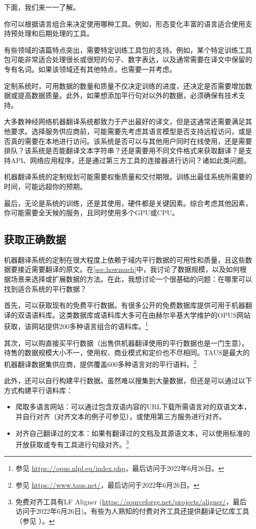 \documentclass[output=paper]{langscibook}
\begin{document}
下面，我们来一一了解。

你可以根据语言组合来决定使用哪种工具。例如，形态变化丰富的语言适合使用支持预处理和后期处理的工具。

有些领域的语篇特点突出，需要特定训练工具包的支持。例如，某个特定训练工具包可能非常适合处理很长或很短的句子、数字表达，以及通常需要在译文中保留的专有名词。如果该领域还有其他特点，也需要一并考虑。

定制系统时，可用数据的数量和质量不仅决定训练的进度，还决定是否需要增加数据或提高数据质量。此外，如果想添加平行句对以外的数据，必须确保有技术支持。
 
大多数神经网络机器翻译系统都致力于产出最好的译文，但是这通常还需要满足其他要求。选择服务供应商前，可能需要先考虑其语言模型是否支持远程访问，或是否真的需要在本地进行访问。该系统是否可以与其他用户同时在线使用，还是需要排队？该系统是否能翻译文本字符串？还是需要用不同文件格式来获取翻译？是支持API、网络应用程序，还是通过第三方工具的连接器进行访问？诸如此类问题。

机器翻译系统的定制规划可能需要权衡质量和交付期限。训练出最佳系统所需要的时间，可能远超你的预期。

最后，无论是系统的训练，还是其使用，硬件都是关键因素。综合考虑其他因素，你可能需要全天候的服务，且同时使用多个GPU或CPU。


\subsection{获取正确数据}\largerpage
机器翻译系统的定制在很大程度上依赖于域内平行数据的可用性和质量，且这些数据要接近需要翻译的原文。在\ref{sec:howmuch}中，我讨论了数据规模，以及如何根据场景来选择或扩展数据的方法。在此，我想讨论一个很基础的问题：在哪里可以找到适合系统的平行数据？

首先，可以获取现有的免费平行数据。有很多公开的免费数据库提供可用于机器翻译的双语语料库。这类数据库或语料库大多可在由赫尔辛基大学维护的OPUS网站获取，该网站提供200多种语言组合的语料库。\footnote{参见 \url{https://opus.nlpl.eu/index.php}，最后访问于2022年6月26日。}

其次，可以购直接买平行数据（出售供机器翻译使用的平行数据也是一门生意）。待售的数据规模大小不一，使用权、商业模式和定价也不尽相同。TAUS是最大的机器翻译数据集供应商，提供覆盖600多种语言对的平行语料。\footnote{参见 \url{https://www.taus.net/}，最后访问于2022年6月26日。} 

此外，还可以自行构建平行数据。虽然难以搜集到大量数据，但还是可以通过以下方式构建平行语料库：

\begin{itemize}
\item 爬取多语言网站：可以通过包含双语内容的URL下载所需语言对的双语文本，并自行对齐（对齐文本的例子可参见），或使用第三方服务进行对齐。

\item 对齐自己翻译过的文本：如果有翻译过的文档及其源语文本，可以使用标准的开放获取或专有工具进行句级对齐。\footnote{免费对齐工具有LF Aligner (\url{https://sourceforge.net/projects/aligner/}，最后访问于2022年6月26日)。有些为人熟知的付费对齐工具还提供翻译记忆库工具（参见 ）。}

\end{itemize}
\end{document}
